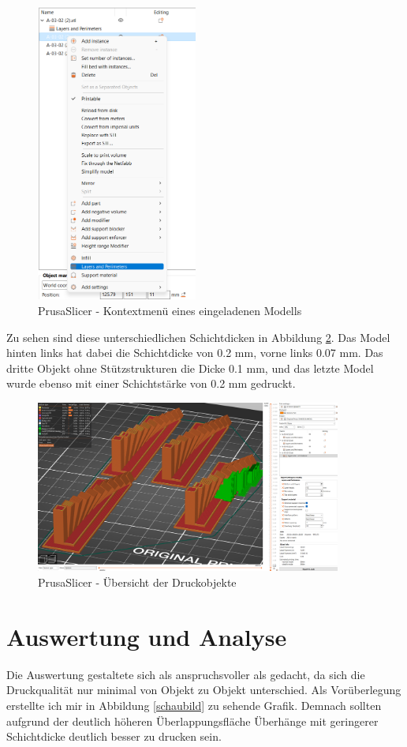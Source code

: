 \documentclass[a4paper,12pt,bibtotocnumbered]{scrartcl}
\numberwithin{equation}{section} %
\begin{document}
\begin{figure}[H]
\centerline{\includegraphics[width=200px]{./images/lyerheight.png}}
\caption{PrusaSlicer - Kontextmenü eines eingeladenen Modells}
\label{layerheight}
\end{figure}

Zu sehen sind diese unterschiedlichen Schichtdicken in Abbildung \ref*{slice_now}. Das Model hinten links hat dabei die Schichtdicke von 0.2 mm, vorne links 0.07 mm. Das dritte Objekt ohne Stützstrukturen die Dicke 0.1 mm, und das letzte Model wurde ebenso mit einer Schichtstärke von 0.2 mm gedruckt.
			
\begin{figure}[H]
\centerline{\includegraphics[width=380px]{./images/prusa.png}}
\caption{PrusaSlicer - Übersicht der Druckobjekte}
\label{slice_now}
\end{figure}

\section[Auswertung und Analyse]{Auswertung und Analyse}
Die Auswertung gestaltete sich als anspruchsvoller als gedacht, da sich die Druckqualität nur minimal von Objekt zu Objekt unterschied. Als Vorüberlegung erstellte ich mir in Abbildung \ref*{schaubild} zu sehende Grafik. Demnach sollten aufgrund der deutlich höheren Überlappungsfläche Überhänge mit geringerer Schichtdicke deutlich besser zu drucken sein.
\end{document}

